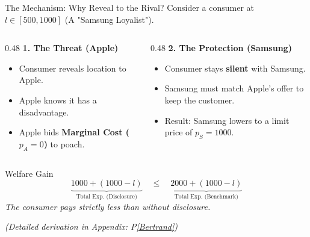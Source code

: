 \documentclass{beamer}
\begin{document}
\begin{frame}{The Mechanism: Why Reveal to the Rival?}
    Consider a consumer at $l \in [500, 1000]$ (A "Samsung Loyalist").

    \begin{columns}[T]
        \begin{column}{0.48\textwidth}
            \textbf{1. The Threat (Apple)}
            \begin{itemize}
                \item Consumer reveals location to Apple.
                \item Apple knows it has a disadvantage.
                \item Apple bids \textbf{Marginal Cost ($p_A=0$)} to poach.
            \end{itemize}
        \end{column}
        \begin{column}{0.48\textwidth}
            \textbf{2. The Protection (Samsung)}
            \begin{itemize}
                \item Consumer stays \textbf{silent} with Samsung.
                \item Samsung must match Apple's offer to keep the customer.
                \item Result: Samsung lowers to a limit price of $p_S = 1000$.
            \end{itemize}
        \end{column}
    \end{columns}

    \vspace{0.3cm}
    \begin{block}{Welfare Gain}
        \[
            \underbrace{1000 + (1000 - l)}_{\text{Total Exp. (Disclosure)}} \quad \le \quad \underbrace{2000 + (1000 - l)}_{\text{Total Exp. (Benchmark)}}
        \]
        \textit{The consumer pays strictly less than without disclosure.}
    \end{block}
    \footnotesize{\textit{(Detailed derivation in Appendix: P\ref{Bertrand})}}
\end{frame}
\end{document}
